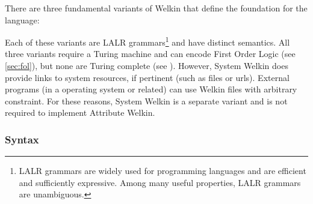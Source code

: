 There are three fundamental variants of Welkin that define the foundation for the language:
Each of these variants are LALR grammars\footnote{LALR grammars are widely used for programming languages and are efficient and sufficiently expressive. Among many useful properties, LALR grammars are unambiguous.} and have distinct semantics. All three variants require a Turing machine and can encode First Order Logic (see \ref{sec:fol}), but none are Turing complete (see ). However, System Welkin does provide links to system resources, if pertinent (such as files or urls). External programs (in a operating system or related) can use Welkin files with arbitrary constraint. For these reasons, System Welkin is a separate variant and is not required to implement Attribute Welkin.

\subsubsection*{Syntax}
\label{section:syntax}

